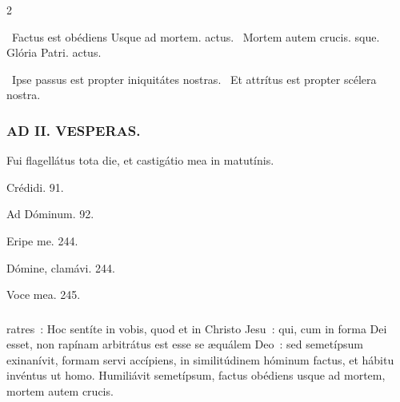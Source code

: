 \documentclass[9pt,twoside]{extarticle}
\begin{document}
\begin{multicols}{2}
{{{\begin{tightlist}{}
\item {}~Factus est obédiens \textred{*} Usque ad mortem. actus. ~Mortem autem crucis. sque. Glória Patri. actus.
\item {}~Ipse passus est propter iniquitátes nostras. ~Et attrítus est propter scélera nostra.
\end{tightlist}

\subsubsection*{\center \textsc{AD II. VESPERAS.}}
\begin{tightlist}{}
\item {} Fui flagellátus tota die, et castigátio mea in matutínis.
\item {} Crédidi. 91. 
\item {} Ad Dóminum. 92. 
\item {} Eripe me. 244. 
\item {} Dómine, clamávi. 244. 
\item {} Voce mea. 245.
\end{tightlist}

\subsubsection*{}
ratres~: Hoc sentíte in vobis, quod et in Christo Jesu~: qui, cum in forma Dei esset, non rapínam arbitrátus est esse se æquálem Deo~: sed semetípsum exinanívit, formam servi accípiens, in similitúdinem hóminum factus, et hábitu invéntus ut homo. Humiliávit semetípsum, factus obédiens usque ad mortem, mortem autem crucis.

}}}
\end{multicols}
\end{document}
